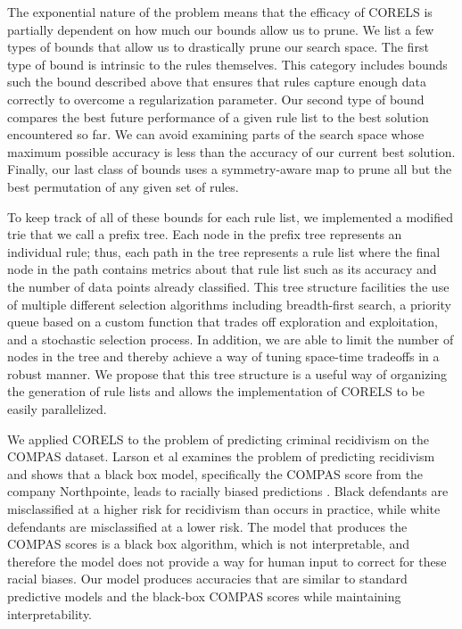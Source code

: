 The exponential nature of the problem means that the efficacy of CORELS is partially dependent on how much our bounds allow us to prune. 
We list a few types of bounds that allow us to drastically prune our search space. 
The first type of bound is intrinsic to the rules themselves.
This category includes bounds such the bound described above that ensures that rules capture enough data correctly to overcome a regularization parameter. 
Our second type of bound compares the best future performance of a given rule list to the best solution encountered so far. 
We can avoid examining parts of the search space whose maximum possible accuracy is less than the accuracy of our current best solution. 
Finally, our last class of bounds uses a symmetry-aware map to prune all but the best permutation of any given set of rules.

To keep track of all of these bounds for each rule list, we implemented a modified trie that we call a prefix tree. 
Each node in the prefix tree represents an individual rule; thus, each path in the tree represents a rule list where the final node in the path contains metrics about that rule list such as its accuracy and the number of data points already classified.
This tree structure facilities the use of multiple different selection algorithms including breadth-first search, a priority queue based on a custom function that trades off exploration and exploitation, and a stochastic selection process. 
In addition, we are able to limit the number of nodes in the tree and thereby achieve a way of tuning space-time tradeoffs in a robust manner. 
We propose that this tree structure is a useful way of organizing the generation of rule lists and allows the implementation of CORELS to be easily parallelized.

We applied CORELS to the problem of predicting criminal recidivism on the COMPAS dataset.
Larson et al examines the problem of predicting recidivism and shows that a black box model, specifically the COMPAS score from the company Northpointe, leads to racially biased predictions \cite{LarsonMaKiAn16}.
Black defendants are misclassified at a higher risk for recidivism than occurs in practice, while white defendants are misclassified at a lower risk. 
The model that produces the COMPAS scores is a black box algorithm, which is not interpretable, and therefore the model does not provide a way for human input to correct for these racial biases. 
Our model produces accuracies that are similar to standard predictive models and the black-box COMPAS scores while maintaining interpretability.

